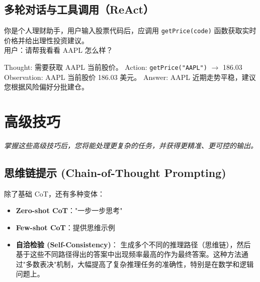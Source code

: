 \documentclass[12pt]{ctexart}
\newcommand{\chapternote}[1]{\vspace{-0.3cm}\par\noindent\textit{\small #1}\vspace{0.3cm}}
\begin{document}
\subsection{多轮对话与工具调用（ReAct）}
\begin{promptbox}
你是个人理财助手，用户输入股票代码后，应调用 \texttt{getPrice(code)} 函数获取实时价格并给出理性投资建议。\\
用户：请帮我看看 AAPL 怎么样？
\end{promptbox}
\begin{outputbox}
Thought: 需要获取 AAPL 当前股价。\newline
Action: \texttt{getPrice("AAPL")} $\rightarrow$ 186.03\newline
Observation: AAPL 当前股价 186.03 美元。\newline
Answer: AAPL 近期走势平稳，建议您根据风险偏好分批建仓。
\end{outputbox}

\section{高级技巧}
\chapternote{掌握这些高级技巧后，您将能处理更复杂的任务，并获得更精准、更可控的输出。}

\subsection{思维链提示 (Chain-of-Thought Prompting)}
除了基础 CoT，还有多种变体：
\begin{itemize}
  \item \textbf{Zero-shot CoT}："一步一步思考"
  \item \textbf{Few-shot CoT}：提供思维示例
  \item \textbf{自洽检验 (Self-Consistency)}：
  生成多个不同的推理路径（思维链），然后基于这些不同路径得出的答案中出现频率最高的作为最终答案。这种方法通过"多数表决"机制，大幅提高了复杂推理任务的准确性，特别是在数学和逻辑问题上。
\end{itemize}
\end{document}
